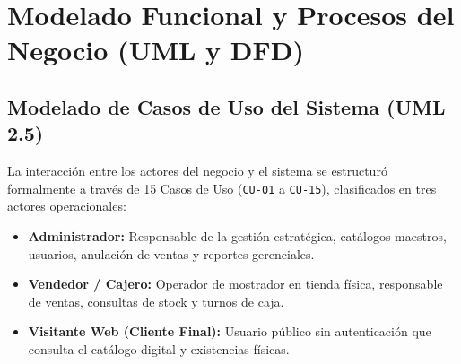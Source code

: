 \chapter{Modelado Funcional y Procesos del Negocio (UML y DFD)}

\section{Modelado de Casos de Uso del Sistema (UML 2.5)}
La interacción entre los actores del negocio y el sistema se estructuró formalmente a través de 15 Casos de Uso (\texttt{CU-01} a \texttt{CU-15}), clasificados en tres actores operacionales:
\begin{itemize}
    \item \textbf{Administrador:} Responsable de la gestión estratégica, catálogos maestros, usuarios, anulación de ventas y reportes gerenciales.
    \item \textbf{Vendedor / Cajero:} Operador de mostrador en tienda física, responsable de ventas, consultas de stock y turnos de caja.
    \item \textbf{Visitante Web (Cliente Final):} Usuario público sin autenticación que consulta el catálogo digital y existencias físicas.
\end{itemize}

